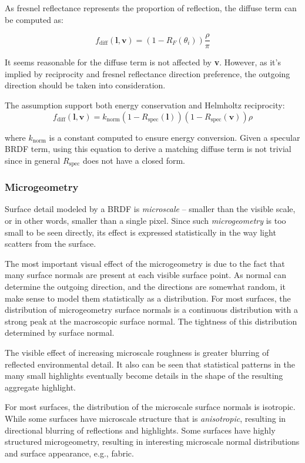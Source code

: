 \documentclass[10pt, a4paper]{article}
\begin{document}
            As fresnel reflectance represents the proportion of reflection, the diffuse term can be computed as:

            $$f_{\text{diff}}(\textbf{l}, \textbf{v}) = (1 - R_F(\theta_i))\frac{\rho}{\pi}$$

            It seems reasonable for the diffuse term is not affected by \textbf{v}. However, as it's implied by reciprocity and fresnel reflectance direction preference, the outgoing direction should be taken into consideration. 

            The assumption support both energy conservation and Helmholtz reciprocity: 
            $$f_{\text{diff}}(\textbf{l}, \textbf{v}) = k_{\text{norm}}(1 - R_{\text{spec}}(\textbf{l}))(1 - R_{\text{spec}}(\textbf{v}))\rho$$

            where $k_{\text{norm}}$ is a constant computed to ensure energy conversion. Given a specular BRDF term, using this equation to derive a matching diffuse term is not trivial since in general $R_{\text{spec}}$ does not have a closed form. 
        
        \subsubsection{Microgeometry}
            Surface detail modeled by a BRDF is \emph{microscale} -- smaller than the visible scale, or in other words, smaller than a single pixel. Since such \emph{microgeometry} is too small to be seen directly, its effect is expressed statistically in the way light scatters from the surface. 

            The most important visual effect of the microgeometry is due to the fact that many surface normals are present at each visible surface point. As normal can determine the outgoing direction, and the directions are somewhat random, it make sense to model them statistically as a distribution. For most surfaces, the distribution of microgeometry surface normals is a continuous distribution with a strong peak at the macroscopic surface normal. The tightness of this distribution determined by surface normal. 

            The visible effect of increasing microscale roughness is greater blurring of reflected environmental detail. It also can be seen that  statistical patterns in the many small highlights eventually become details in the shape of the resulting aggregate highlight.  

            For most surfaces, the distribution of the microscale surface normals is isotropic. While some surfaces have microscale structure that is \emph{anisotropic}, resulting in directional blurring of reflections and highlights. Some surfaces have highly structured microgeometry, resulting in interesting microscale normal distributions and surface appearance, e.g., fabric. 
\end{document}

